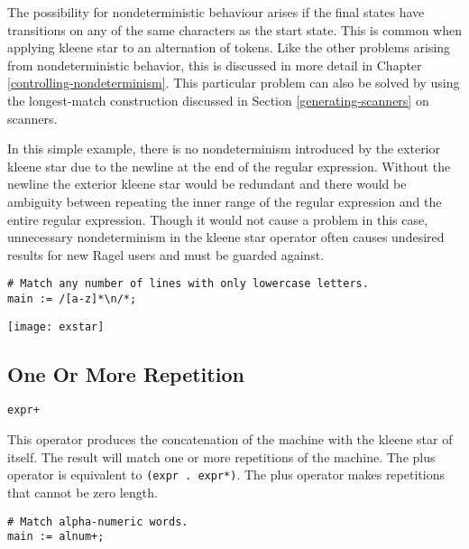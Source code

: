 \documentclass[letterpaper,11pt,oneside]{book}
\newcommand{\verbspace}{\vspace{10pt}}
\newcommand{\graphspace}{\vspace{10pt}}
\newenvironment{inline_code}{\def\baselinestretch{1}\vspace{12pt}\small}{}
\begin{document}
The possibility for nondeterministic behaviour arises if the final states have
transitions on any of the same characters as the start state.  This is common
when applying kleene star to an alternation of tokens. Like the other problems
arising from nondeterministic behavior, this is discussed in more detail in Chapter
\ref{controlling-nondeterminism}. This particular problem can also be solved
by using the longest-match construction discussed in Section 
\ref{generating-scanners} on scanners.

In this simple
example, there is no nondeterminism introduced by the exterior kleene star due to
the newline at the end of the regular expression. Without the newline the
exterior kleene star would be redundant and there would be ambiguity between
repeating the inner range of the regular expression and the entire regular
expression. Though it would not cause a problem in this case, unnecessary
nondeterminism in the kleene star operator often causes undesired results for
new Ragel users and must be guarded against.

\begin{inline_code}
\begin{verbatim}
# Match any number of lines with only lowercase letters.
main := /[a-z]*\n/*;
\end{verbatim}
\end{inline_code}

\graphspace
\begin{center}
\texttt{[image: exstar]}
\end{center}
\graphspace

\subsection{One Or More Repetition}

\verb|expr+|
\verbspace

This operator produces the concatenation of the machine with the kleene star of
itself. The result will match one or more repetitions of the machine. The plus
operator is equivalent to \verb|(expr . expr*)|.  The plus operator makes
repetitions that cannot be zero length.

\begin{inline_code}
\begin{verbatim}
# Match alpha-numeric words.
main := alnum+;
\end{verbatim}
\end{inline_code}
\end{document}
